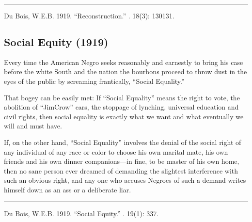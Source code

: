 \documentclass[letterpaper,10pt,english]{jupyterBook}
\begin{document}
\bigskip\hrule\bigskip


\sphinxAtStartPar
{} Du Bois, W.E.B. 1919. “Reconstruction.” . 18(3): 130\sphinxhyphen{}131.


\subsection{Social Equity (1919)}
\label{\detokenize{Volumes/19/01/social_equity:social-equity-1919}}\label{\detokenize{Volumes/19/01/social_equity::doc}}
\sphinxAtStartPar
Every time the American Negro seeks reasonably and earnestly to bring his case before the white South and the nation the bourbons proceed to throw dust in the eyes of the public by screaming frantically, “Social Equality.”

\sphinxAtStartPar
That bogey can be easily met: If “Social Equality” means the right to vote, the abolition of “Jim\sphinxhyphen{}Crow” cars, the stoppage of lynching, universal education and civil rights, then social equality is exactly what we want and what eventually we will and must have.

\sphinxAtStartPar
If, on the other hand, “Social Equality” involves the denial of the social right of any individual of any race or color to choose his own marital mate, his own friends and his own dinner companions—in fine, to be master of his own home, then no sane person ever dreamed of demanding the slightest interference with such an obvious right, and any one who accuses Negroes of such a demand writes himself down as an ass or a deliberate liar.


\bigskip\hrule\bigskip


\sphinxAtStartPar
{} Du Bois, W.E.B. 1919. “Social Equity.” . 19(1): 337.
\end{document}
